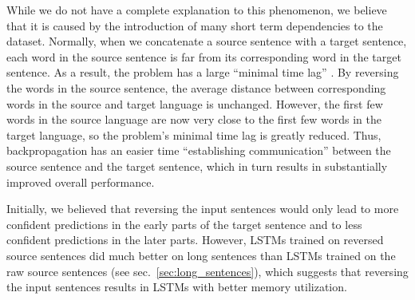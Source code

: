 While we do not have a complete explanation to this phenomenon, we
believe that it is caused by the introduction of many short term
dependencies to the dataset.  Normally, when we concatenate a source
sentence with a target sentence, each word in the source sentence is
far from its corresponding word in the target sentence. As a result,
the problem has a large ``minimal time lag'' \cite{minimal_time_lag}.  By reversing the
words in the source sentence, the average distance between
corresponding words in the source and target language is unchanged.
However, the first few words in the source language are now very close to
the first few words in the target language, so the problem's minimal
time lag is greatly reduced. Thus, backpropagation has an easier time
``establishing communication'' between the source sentence and the
target sentence, which in turn results in substantially improved overall
 performance.

Initially, we believed that reversing the input sentences would 
only lead to more confident predictions in the early parts of the target
sentence and to less confident predictions in the later parts.
However, LSTMs trained on reversed source sentences did much better on
long sentences than LSTMs trained on the raw source sentences (see
sec.~\ref{sec:long_sentences}), which suggests that reversing the
input sentences results in LSTMs with better memory utilization. 






